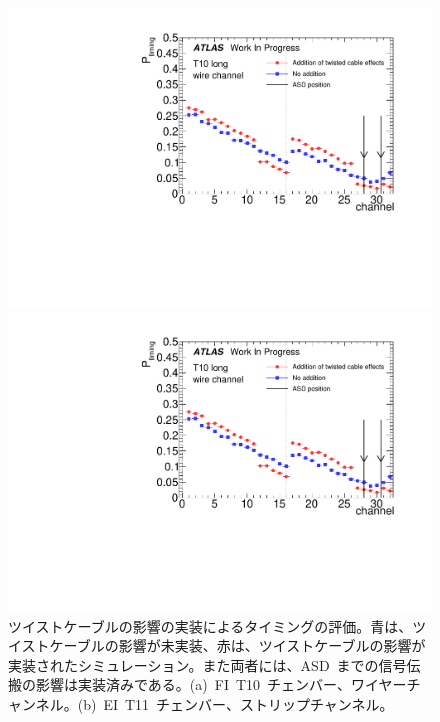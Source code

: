 \begin{figure}[tbp]
    \begin{minipage}{0.49\hsize}
    \centering   
    \includegraphics[width=\textwidth,page=1]{img/plot/twist.pdf}
    \subcaption{}
    \end{minipage}
    \begin{minipage}{0.49\hsize}
    \centering   
    \includegraphics[width=\textwidth,page=2]{img/plot/twist.pdf}
    \subcaption{}
    \end{minipage}
    \caption[ツイストケーブルの影響の実装によるタイミングの評価]{ツイストケーブルの影響の実装によるタイミングの評価。青は、ツイストケーブルの影響が未実装、赤は、ツイストケーブルの影響が実装されたシミュレーション。また両者には、ASD~までの信号伝搬の影響は実装済みである。(a)~FI~T10~チェンバー、ワイヤーチャンネル。(b)~EI~T11~チェンバー、ストリップチャンネル。}
    \label{fig:twist}
\end{figure}

